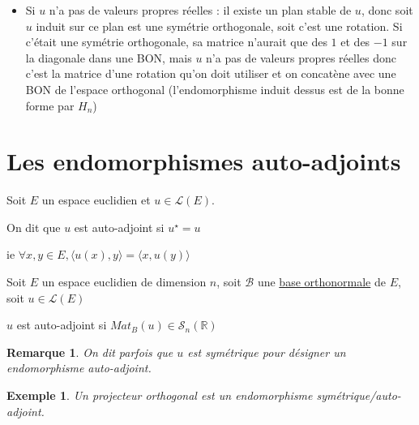 \documentclass[a4paper,12pt]{book}
\newcommand{\Def}[2]{\begin{tcolorbox}[sharp corners, colback=white,colframe=blue!90!black!75, title=Définition : #1]#2\end{tcolorbox}}
\newcommand{\Prop}[2]{\begin{tcolorbox}[sharp corners, colback=white,colframe=red!90!black!75, title=Proposition : #1]#2\end{tcolorbox}}
\newtheorem{Exe}{Exemple}[section]
\newtheorem{Rem}{Remarque}[section]
\def\R{\mathbb{R}}
\begin{document}
{\begin{itemize}
\par Par $H_n$, on prend $B_2$ une BON de $E\lambda(u)^\perp$ telle que l'endomorphisme induit par $u$ sur $E_\lambda(u)^\perp$ a une matrice de la forme recherchée.
\par Donc dans la BON $B=(B_1, B_2)$, $Mat_{B}(u)$ est de la forme recherchée.
\item Si $u$ n'a pas de valeurs propres réelles : il existe un plan stable de $u$, donc soit $u$ induit sur ce plan est une symétrie orthogonale, soit c'est une rotation. Si c'était une symétrie orthogonale, sa matrice n'aurait que des $1$ et des $-1$ sur la diagonale dans une BON, mais $u$ n'a pas de valeurs propres réelles donc c'est la matrice d'une rotation qu'on doit utiliser et on concatène avec une BON de l'espace orthogonal (l'endomorphisme induit dessus est de la bonne forme par $H_n$)
\end{itemize}}


\section{Les endomorphismes auto-adjoints}
\Def{}{Soit $E$ un espace euclidien et $u\in\mathcal{L}(E)$.
\par On dit que $u$ est auto-adjoint si $u^\star = u$
\par ie $\forall x,y\in E, \langle u(x),y\rangle = \langle x, u(y)\rangle$}
\Prop{}{Soit $E$ un espace euclidien de dimension $n$, soit $\mathcal{B}$ une \underline{base orthonormale} de $E$, soit $u\in\mathcal{L}(E)$
\par $u$ est auto-adjoint si $Mat_B(u)\in\mathcal{S}_n(\R)$}
\begin{Rem}
On dit parfois que $u$ est symétrique pour désigner un endomorphisme auto-adjoint.
\end{Rem}
\begin{Exe}
Un projecteur orthogonal est un endomorphisme symétrique/auto-adjoint.
\end{Exe}
\end{document}
